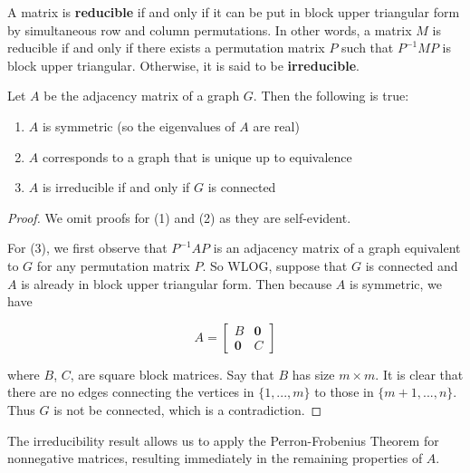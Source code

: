 \begin{definition}
  A matrix is \textbf{reducible} if and only if it can be put in block upper triangular
  form by simultaneous row and column permutations. In other words, a matrix $M$
  is reducible if and only if there exists a permutation matrix $P$ such that
  $P^{-1}MP$ is block upper triangular. Otherwise, it is said to be
  \textbf{irreducible}.
\end{definition}

\begin{proposition}
  Let $A$ be the adjacency matrix of a graph $G$. Then the following is true:

  \begin{enumerate}
  \item $A$ is symmetric (so the eigenvalues of $A$ are real)
  \item $A$ corresponds to a graph that is unique up to equivalence
  \item $A$ is irreducible if and only if $G$ is connected
  \end{enumerate}
\end{proposition}

\begin{proof}
  We omit proofs for (1) and (2) as they are self-evident.

  For (3), we first observe that $P^{-1}AP$ is an adjacency matrix of a graph
  equivalent to $G$ for any permutation matrix $P$. So WLOG, suppose that $G$ is
  connected and $A$ is already in block upper triangular form. Then because $A$
  is symmetric, we have

  \[
    A = \begin{bmatrix}
      B & \mathbf{0} \\
      \mathbf{0} & C
    \end{bmatrix}
  \]

  where $B$, $C$, are square block matrices. Say that $B$ has size $m \times m$.
  It is clear that there are no edges connecting the vertices in $\{1, ..., m\}$
  to those in $\{m+1, ..., n\}$. Thus $G$ is not be connected, which is a
  contradiction.
\end{proof}

The irreducibility result allows us to apply the Perron-Frobenius Theorem for
nonnegative matrices, resulting immediately in the remaining properties of $A$.

